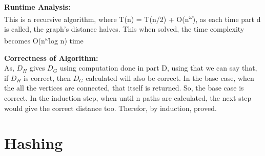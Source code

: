\documentclass[a4paper]{article}
\begin{document}
\begin{enumerate}[label=(\alph*)]
{\begin{minipage}{\linewidth}
\begin{algorithm}[H]
\begin{algorithmic}[1]
\end{algorithmic}
\end{algorithm}
\end{minipage}
\par}

\textbf{Runtime Analysis:}\\
This is a recursive algorithm, where T(n) = T(n/2) + O(n\textsuperscript{$\omega$}), as each time part d is called, the graph's distance halves. This when solved, the time complexity becomes O(n\textsuperscript{$\omega$}log n) time

\textbf{Correctness of Algorithm:}\\
As, $D_H$ gives $D_G$ using computation done in part D, using that we can say that, if $D_H$ is correct, then $D_G$ calculated will also be correct. In the base case, when the all the vertices are connected, that itself is returned. So, the base case is correct. In the induction step, when until n paths are calculated, the next step would give the correct distance too. Therefor, by induction, proved.

\end{enumerate}
\newpage
\section{Hashing}
\end{document}
